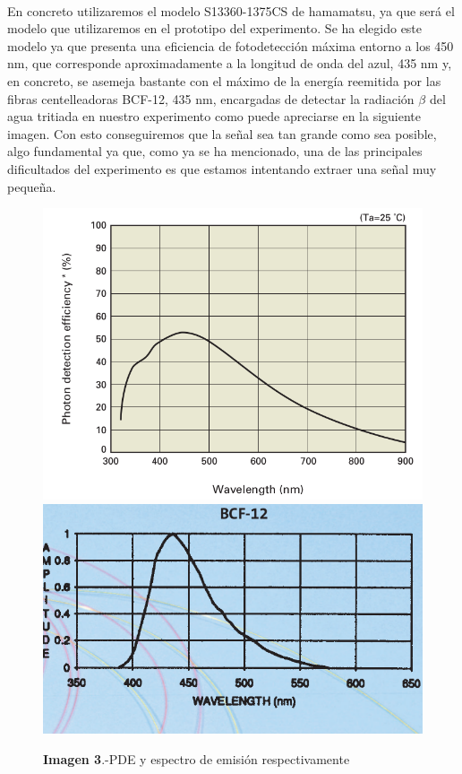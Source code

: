 \documentclass[11pt, a4paper]{article}
\begin{document}
\paragraph {} 
En concreto utilizaremos el modelo S13360-1375CS de hamamatsu, ya que será el modelo que utilizaremos en el prototipo del experimento. Se ha elegido este modelo ya que presenta una eficiencia de fotodetección máxima entorno a los 450 nm, que corresponde aproximadamente a la longitud de onda del azul, 435 nm y, en concreto, se asemeja bastante con el máximo de la energía reemitida por las fibras centelleadoras BCF-12, 435 nm, encargadas de detectar la radiación $\beta$ del agua tritiada en nuestro experimento como puede apreciarse en la siguiente imagen. Con esto conseguiremos que la señal sea tan grande como sea posible, algo fundamental ya que, como ya se ha mencionado, una de las principales dificultados del experimento es que estamos intentando extraer una señal muy pequeña.

\begin{figure}[htb]
\centering
{
\includegraphics[scale=0.2]{PED.png} 
}
{
\includegraphics[scale=0.25]{EmisionBCF12.png} 
}
\caption{\textbf{Imagen 3}.-PDE y espectro de emisión respectivamente}
\end{figure}
\end{document}

